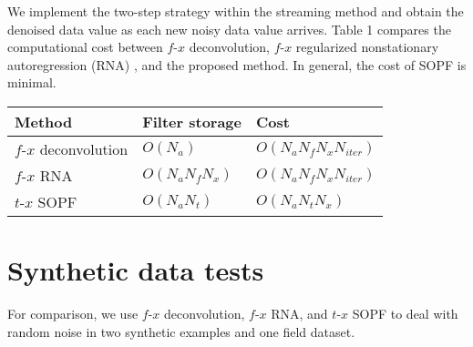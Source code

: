 We implement the two-step strategy within the streaming
method and obtain the denoised data value as each
new noisy data value arrives. Table 1 compares the computational cost
between $f$-$x$ deconvolution, $f$-$x$ regularized 
nonstationary autoregression (RNA) \cite[]{Liu12}, and the proposed
method. In general, the cost of SOPF is minimal.

{ \begin{center}
\begin{tabular}{|l|l|l|}
\hline
Method & Filter storage & Cost \\
\hline
$f$-$x$ deconvolution & $O(N_a)$ & $O(N_a N_f N_x N_{iter})$ \\
\hline
$f$-$x$ RNA & $O(N_a N_f N_x)$ & $O(N_a N_f N_x N_{iter})$ \\
\hline
$t$-$x$ SOPF & $O(N_a N_t)$ & $O(N_a N_t N_x)$ \\
\hline
\end{tabular}
  \end{center}
}

\section{Synthetic data tests}
For comparison, we use $f$-$x$ deconvolution, $f$-$x$ RNA, and $t$-$x$
SOPF to deal with random noise in two synthetic examples and one field
dataset.

